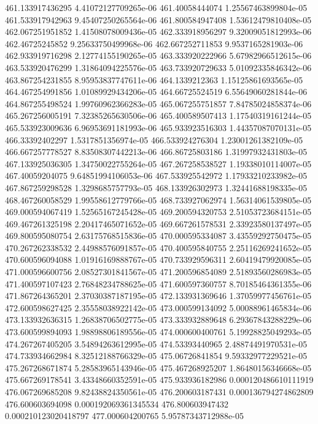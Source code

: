 {461.133917436295 4.41072127709265e-06
461.40058444074 1.25567463899804e-05
461.533917942963 9.45407250265564e-06
461.800584947408 1.53612479810408e-05
462.067251951852 1.41508078009436e-05
462.333918956297 9.32009051812993e-06
462.46725245852 9.25633750499968e-06
462.667252711853 9.9537165281903e-06
462.933919716298 2.12774155190265e-05
463.333920222966 5.67982966512615e-06
463.533920476299 1.31864094225576e-05
463.733920729633 5.01092335846342e-06
463.867254231855 8.95953837747611e-06
464.1339212363 1.15125861693565e-05
464.467254991856 1.01089929434206e-05
464.66725524519 6.55649060281844e-06
464.867255498524 1.99760962366283e-05
465.067255751857 7.84785024858374e-06
465.267256005191 7.32385265630506e-06
465.400589507413 1.17540319161244e-05
465.533923009636 6.96953691181993e-06
465.933923516303 1.44357087070131e-05
466.33392402297 1.5317851356974e-05
466.533924276304 1.23001261382109e-05
466.667257778527 8.83508307442213e-06
466.86725803186 1.31997932431803e-05
467.133925036305 1.34750022755264e-05
467.267258538527 1.19338010114007e-05
467.40059204075 9.64851994106053e-06
467.533925542972 1.17933210233982e-05
467.867259298528 1.3298685757793e-05
468.133926302973 1.32441688198335e-05
468.467260058529 1.99558612779766e-05
468.733927062974 1.56314061539805e-05
469.000594067419 1.52565167245428e-05
469.200594320753 2.51053723684151e-05
469.467261325198 2.20417465071652e-05
469.667261578531 2.33923580137497e-05
469.800595080754 2.63175768515836e-05
470.000595334087 3.43559292750475e-05
470.267262338532 2.44988576091857e-05
470.400595840755 2.25116269241652e-05
470.600596094088 1.01916169888767e-05
470.733929596311 2.60419479920085e-05
471.000596600756 2.08527301841567e-05
471.200596854089 2.51893560286983e-05
471.400597107423 2.76848234788625e-05
471.600597360757 8.70185464361355e-06
471.867264365201 2.37030387187195e-05
472.133931369646 1.37059977456761e-05
472.600598627425 2.35558038922142e-05
473.000599134092 5.00088961465834e-06
473.133932636315 1.26838706502775e-05
473.333932889648 6.29367843288229e-06
473.600599894093 1.98898806189556e-05
474.000600400761 5.19928825049293e-05
474.267267405205 3.54894263612995e-05
474.53393440965 2.48874491970531e-05
474.733934662984 8.32512188766329e-05
475.06726841854 9.59332977229521e-05
475.267268671874 5.28583965143946e-05
475.467268925207 1.86480156346668e-05
475.667269178541 3.43348660352591e-05
475.933936182986 0.000120486610111919
476.067269685208 9.82438824350561e-05
476.200603187431 0.000136794274862809
476.600603694098 0.000192069361345534
476.800603947432 0.000210123020418797
477.000604200765 5.95787343712988e-05
}
